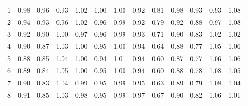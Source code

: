 \documentclass[11pt]{article}
\begin{document}
\begin{appendices}
\begin{table}[htbp]
\begin{tabular}{c|cccc|cccc|cccc}
    \midrule
    1     & 0.98  & 0.96  & 0.93  & 1.02  & 1.00  & 1.00  & 0.92  & 0.81  & 0.98  & 0.93  & 0.93  & 1.08 \\
    2     & 0.94  & 0.93  & 0.96  & 1.02  & 0.96  & 0.99  & 0.92  & 0.79  & 0.92  & 0.88  & 0.97  & 1.08 \\
    3     & 0.92  & 0.90  & 1.00  & 0.97  & 0.96  & 0.99  & 0.93  & 0.71  & 0.90  & 0.83  & 1.02  & 1.02 \\
    4     & 0.90  & 0.87  & 1.03  & 1.00  & 0.95  & 1.00  & 0.94  & 0.64  & 0.88  & 0.77  & 1.05  & 1.06 \\
    5     & 0.88  & 0.85  & 1.04  & 1.00  & 0.94  & 1.01  & 0.94  & 0.60  & 0.87  & 0.77  & 1.06  & 1.06 \\
    6     & 0.89  & 0.84  & 1.05  & 1.00  & 0.95  & 1.00  & 0.94  & 0.60  & 0.88  & 0.78  & 1.08  & 1.05 \\
    7     & 0.90  & 0.83  & 1.04  & 0.99  & 0.95  & 0.99  & 0.95  & 0.63  & 0.89  & 0.79  & 1.08  & 1.04 \\
    8     & 0.91  & 0.85  & 1.03  & 0.98  & 0.95  & 0.99  & 0.97  & 0.67  & 0.90  & 0.82  & 1.06  & 1.01 \\
    \bottomrule
    \end{tabular}%
    
  \label{uncondulc}%
\end{table}%


\end{appendices}
\end{document}
